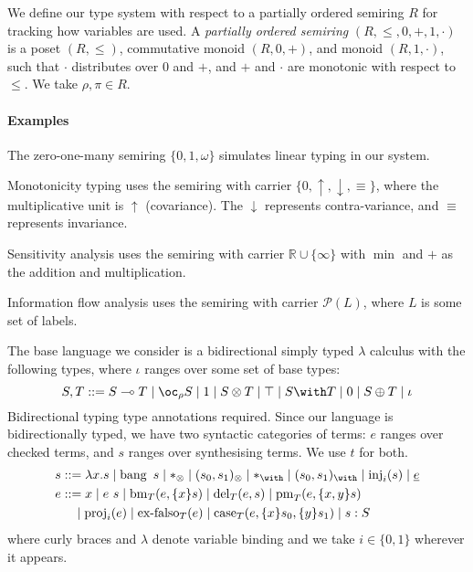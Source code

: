 We define our type system with respect to a partially ordered semiring
$R$ for tracking how variables are used. A \emph{partially ordered
  semiring} $(R, \leq, 0, +, 1 , \cdot)$ is a poset $(R, \leq)$,
commutative monoid $(R, 0, +)$, and monoid $(R, 1, \cdot)$, such that
$\cdot$ distributes over $0$ and $+$, and $+$ and $\cdot$ are
monotonic with respect to $\leq$. We take $\rho,\pi \in R$.

\paragraph{Examples}
\begin{inparaenum}
\item The zero-one-many semiring $\{0,1,\omega\}$ simulates linear
  typing in our system.
\item Monotonicity typing uses the semiring with carrier
  $\{0,\uparrow,\downarrow,\equiv\}$, where the multiplicative unit is
  $\uparrow$ (covariance). The $\downarrow$ represents
  contra-variance, and $\equiv$ represents invariance.
\item Sensitivity analysis uses the semiring with carrier
  $\mathbb{R} \cup \{\infty\}$ with $\min$ and $+$ as the addition and
  multiplication.
\item Information flow analysis uses the semiring with carrier
  $\mathcal{P}(L)$, where $L$ is some set of labels.
\end{inparaenum}

\medskip

The base language we consider is a
bidirectional \cite{DBLP:journals/toplas/PierceT00} simply typed
$\lambda$ calculus with the following types, where $\iota$ ranges over
some set of base types:
\begin{displaymath}
  S,T ::= \fun{S}{T} \mid \excl{\rho}{S} \mid \tensorOne \mid \tensor{S}{T} \mid
  \withTOne \mid \withT{S}{T} \mid \sumTZero \mid \sumT{S}{T} \mid \iota
\end{displaymath}
Bidirectional typing type annotations required.  Since our language is
bidirectionally typed, we have two syntactic categories of terms: $e$
ranges over checked terms, and $s$ ranges over synthesising terms. We
use $t$ for both.
\begin{displaymath}
  \begin{aligned}
    s &  ::= \lam{x}{s} \mid \bang{s} \mid \unit \mid \ten{s_0}{s_1} \mid \eat \mid \wth{s_0}{s_1} \mid \inj{i}{s} \mid \emb{e} \\
    e &  ::= x \mid \app{e}{s} \mid \bm{T}{e}{\bind{x}{s}} \mid \del{T}{e}{s} \mid \prm{T}{e}{\bind{x,y}{s}} \\
      & \quad \mid \proj{i}{e} \mid \exf{T}{e} \mid
             \cse{T}{e}{\bind{x}{s_0}}{\bind{y}{s_1}} \mid \ann{s}{S}
  \end{aligned}
\end{displaymath}
where curly braces and $\lambda$ denote variable binding and we take
$i \in \{0,1\}$ wherever it appears.

